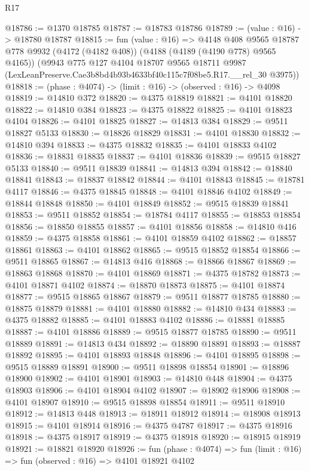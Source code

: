 \begin{lexlean}{R17}
\begin{coremodule}
@18786 := @1370 @18785
@18787 := @18783 @18786
@18789 := (value : @16) -> @18780 @18787
@18815 := fun (value : @16) =>
  @4148
    @408
    @9565
    @18787
    @778
    @9932
    (@4172 (@4182 @408))
    (@4188 (@4189 (@4190 @778) @9565 @4165))
    (@9943
      @775
      @127
      @4104
      @18707
      @9565
      @18711
      @9987
      (LexLeanPreserve.Cae3b8bd4b93b4633bf40c115c7f08be5.R17.__rel_30 @3975))
@18818 := (phase : @4074) -> (limit : @16) -> (observed : @16) -> @4098
@18819 := @14810 @372
@18820 := @4375 @18819
@18821 := @4101 @18820
@18822 := @14810 @384
@18823 := @4375 @18822
@18825 := @4101 @18823 @4104
@18826 := @4101 @18825
@18827 := @14813 @384
@18829 := @9511 @18827 @5133
@18830 := @18826 @18829
@18831 := @4101 @18830
@18832 := @14810 @394
@18833 := @4375 @18832
@18835 := @4101 @18833 @4102
@18836 := @18831 @18835
@18837 := @4101 @18836
@18839 := @9515 @18827 @5133
@18840 := @9511 @18839
@18841 := @14813 @394
@18842 := @18840 @18841
@18843 := @18837 @18842
@18844 := @4101 @18843
@18845 := @18781 @4117
@18846 := @4375 @18845
@18848 := @4101 @18846 @4102
@18849 := @18844 @18848
@18850 := @4101 @18849
@18852 := @9515 @18839 @18841
@18853 := @9511 @18852
@18854 := @18784 @4117
@18855 := @18853 @18854
@18856 := @18850 @18855
@18857 := @4101 @18856
@18858 := @14810 @416
@18859 := @4375 @18858
@18861 := @4101 @18859 @4102
@18862 := @18857 @18861
@18863 := @4101 @18862
@18865 := @9515 @18852 @18854
@18866 := @9511 @18865
@18867 := @14813 @416
@18868 := @18866 @18867
@18869 := @18863 @18868
@18870 := @4101 @18869
@18871 := @4375 @18782
@18873 := @4101 @18871 @4102
@18874 := @18870 @18873
@18875 := @4101 @18874
@18877 := @9515 @18865 @18867
@18879 := @9511 @18877 @18785
@18880 := @18875 @18879
@18881 := @4101 @18880
@18882 := @14810 @434
@18883 := @4375 @18882
@18885 := @4101 @18883 @4102
@18886 := @18881 @18885
@18887 := @4101 @18886
@18889 := @9515 @18877 @18785
@18890 := @9511 @18889
@18891 := @14813 @434
@18892 := @18890 @18891
@18893 := @18887 @18892
@18895 := @4101 @18893 @18848
@18896 := @4101 @18895
@18898 := @9515 @18889 @18891
@18900 := @9511 @18898 @18854
@18901 := @18896 @18900
@18902 := @4101 @18901
@18903 := @14810 @448
@18904 := @4375 @18903
@18906 := @4101 @18904 @4102
@18907 := @18902 @18906
@18908 := @4101 @18907
@18910 := @9515 @18898 @18854
@18911 := @9511 @18910
@18912 := @14813 @448
@18913 := @18911 @18912
@18914 := @18908 @18913
@18915 := @4101 @18914
@18916 := @4375 @4787
@18917 := @4375 @18916
@18918 := @4375 @18917
@18919 := @4375 @18918
@18920 := @18915 @18919
@18921 := @18821 @18920
@18926 := fun (phase : @4074) => fun (limit : @16) => fun (observed : @16) => @4101 @18921 @4102

\end{coremodule}
\end{lexlean}
